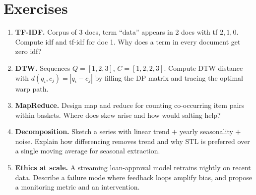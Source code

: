 \section{Exercises}
\begin{enumerate}[label=E8.\arabic*, leftmargin=*, itemsep=0.6em]
    \item \textbf{TF-IDF.} Corpus of 3 docs, term ``data'' appears in 2 docs with tf $2,1,0$. Compute idf and tf-idf for doc 1. Why does a term in every document get zero idf?
    \item \textbf{DTW.} Sequences $Q=[1,2,3]$, $C=[1,2,2,3]$. Compute DTW distance with $d(q_i,c_j)=|q_i-c_j|$ by filling the DP matrix and tracing the optimal warp path.
    \item \textbf{MapReduce.} Design map and reduce for counting co-occurring item pairs within baskets. Where does skew arise and how would salting help?
    \item \textbf{Decomposition.} Sketch a series with linear trend $+$ yearly seasonality $+$ noise. Explain how differencing removes trend and why STL is preferred over a single moving average for seasonal extraction.
    \item \textbf{ Ethics at scale.} A streaming loan-approval model retrains nightly on recent data. Describe a failure mode where feedback loops amplify bias, and propose a monitoring metric and an intervention.
\end{enumerate}
